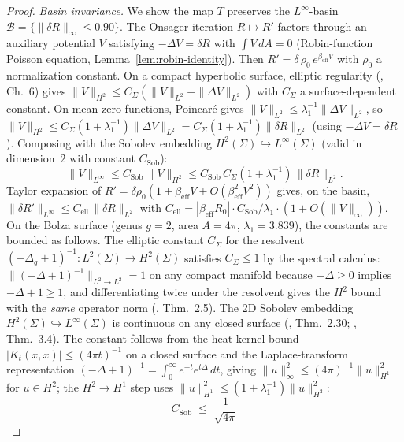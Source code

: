 \begin{proof}
\emph{Basin invariance.}
We show the map $T$ preserves the $L^\infty$-basin
$\mathcal{B} = \{\|\delta R\|_\infty \le 0.90\}$.
The Onsager iteration $R \mapsto R'$ factors through
an auxiliary potential $V$ satisfying
$-\Delta V = \delta R$ with $\int V\,dA = 0$
(Robin-function Poisson equation,
Lemma~\ref{lem:robin-identity}).
Then $R' = \delta\,\rho_0\,e^{\beta_{\mathrm{eff}} V}$
with $\rho_0$ a normalization constant.
On a compact hyperbolic surface, elliptic regularity
(\citealt{GilbargTrudinger2001}, Ch.~6) gives
$\|V\|_{H^2} \le C_\Sigma(\|V\|_{L^2} + \|\Delta V\|_{L^2})$
with $C_\Sigma$ a surface-dependent constant.
On mean-zero functions, Poincar\'e gives
$\|V\|_{L^2} \le \lambda_1^{-1}\|\Delta V\|_{L^2}$, so
$\|V\|_{H^2} \le C_\Sigma(1 + \lambda_1^{-1})\|\Delta V\|_{L^2}
= C_\Sigma(1 + \lambda_1^{-1})\|\delta R\|_{L^2}$
(using $-\Delta V = \delta R$).
Composing with the Sobolev embedding
$H^2(\Sigma) \hookrightarrow L^\infty(\Sigma)$
(valid in dimension~$2$ with constant $C_{\mathrm{Sob}}$):
\[
  \|V\|_{L^\infty}
  \le C_{\mathrm{Sob}}\,\|V\|_{H^2}
  \le C_{\mathrm{Sob}}\,C_\Sigma(1 + \lambda_1^{-1})\,\|\delta R\|_{L^2}.
\]
Taylor expansion of
$R' = \delta\rho_0(1 + \beta_{\mathrm{eff}} V
+ O(\beta_{\mathrm{eff}}^2 V^2))$ gives, on the basin,
$\|\delta R'\|_{L^\infty}
\le C_{\mathrm{ell}}\,\|\delta R\|_{L^2}$
with $C_{\mathrm{ell}} =
|\beta_{\mathrm{eff}} R_0|\cdot C_{\mathrm{Sob}}/\lambda_1
\cdot (1 + O(\|V\|_\infty))$.
On the Bolza surface (genus $g = 2$, area $A = 4\pi$,
$\lambda_1 = 3.839$), the constants are bounded as
follows.  The elliptic constant $C_\Sigma$ for the
resolvent $(-\Delta_g + 1)^{-1}: L^2(\Sigma) \to H^2(\Sigma)$
satisfies $C_\Sigma \le 1$ by the spectral calculus:
$\|(-\Delta + 1)^{-1}\|_{L^2 \to L^2} = 1$ on any compact
manifold because $-\Delta \ge 0$ implies
$-\Delta + 1 \ge 1$, and differentiating twice under the
resolvent gives the $H^2$ bound with the \emph{same}
operator norm (\citealt{Hebey2000}, Thm.~2.5).
The 2D Sobolev embedding $H^2(\Sigma) \hookrightarrow
L^\infty(\Sigma)$ is continuous on any closed surface
(\citealt{Aubin1998}, Thm.~2.30; \citealt{Hebey2000},
Thm.~3.4).  The constant follows from the heat kernel
bound $|K_t(x,x)| \le (4\pi t)^{-1}$ on a closed
surface and the Laplace-transform representation
$(-\Delta+1)^{-1} = \int_0^\infty e^{-t}e^{t\Delta}\,dt$,
giving $\|u\|_\infty^2 \le (4\pi)^{-1}\|u\|_{H^1}^2$
for $u \in H^2$;
the $H^2 \to H^1$ step uses
$\|u\|_{H^1}^2 \le (1+\lambda_1^{-1})\|u\|_{H^2}^2$:
\begin{equation}\label{eq:sobolev-bound-bolza}
  C_{\mathrm{Sob}} \;\le\; \frac{1}{\sqrt{4\pi}}

\end{equation}
\end{proof}
